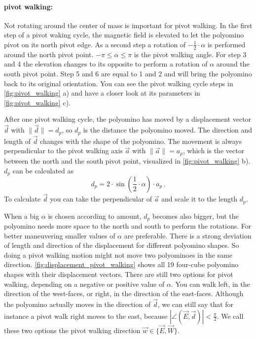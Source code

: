 \paragraph{pivot walking:}
Not rotating around the center of mass is important for pivot walking.
In the first step of a pivot waking cycle, the magnetic field is elevated to let the polyomino pivot on its north pivot edge.
As a second step a rotation of $-\frac{1}{2} \cdot \alpha$ is performed around the north pivot point.
$-\pi \leq \alpha \leq \pi$ is the pivot walking angle.
For step 3 and 4 the elevation changes to its opposite to perform a rotation of $\alpha$ around the south pivot point.
Step 5 and 6 are equal to 1 and 2 and will bring the polyomino back to its original orientation.
You can see the pivot walking cycle steps in \autoref{fig:pivot_walking} a) and have a closer look at its parameters in \autoref{fig:pivot_walking} c).

After one pivot walking cycle, the polyomino has moved by a displacement vector $\vec{d}$ with $\lVert \vec{d} \rVert = d_p$, so $d_p$ is the distance the polyomino moved.
The direction and length of $\vec{d}$ changes with the shape of the polyomino.
The movement is always perpendicular to the pivot walking axis $\vec{a}$ with $\lVert \vec{a} \rVert = a_p$, which is the vector between the north and the south pivot point, visualized in \autoref{fig:pivot_walking} b).
$d_p$ can be calculated as
\begin{equation}
d_p = 2 \cdot \sin\left(\frac{1}{2} \cdot \alpha \right) \cdot a_p \,.
\end{equation}
To calculate $\vec{d}$ you can take the perpendicular of $\vec{a}$ and scale it to the length $d_p$.

When a big $\alpha$ is chosen according to amount, $d_p$ becomes also bigger, but the polyomino needs more space to the north and south to perform the rotations.
For better maneuvering smaller values of $\alpha$ are preferable.
There is a strong deviation of length and direction of the displacement for different polyomino shapes.
So doing a pivot walking motion might not move two polyominoes in the same direction.
\autoref{fig:displacement_pivot_walking} shows all 19 four-cube polyomino shapes with their displacement vectors.
There are still two options for pivot walking, depending on a negative or positive value of $\alpha$.
You can walk left, in the direction of the west-faces, or right, in the direction of the east-faces.
Although the polyomino actually moves in the direction of $\vec{d}$, we can still say that for instance a pivot walk right moves to the east, because $\left| \angle \left( \vec{E}, \vec{d} \right) \right| < \frac{\pi}{2}$.
We call these two options the pivot walking direction $\vec{w} \in \{\vec{E}, \vec{W}\}$.

